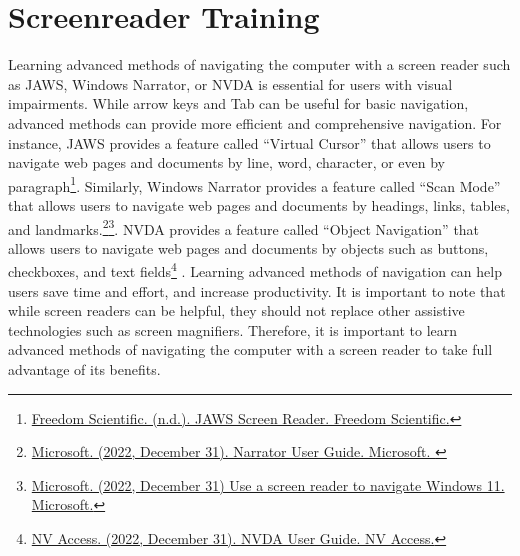 \pagebreak\hypertarget{appx7}{}\section[Screenreader Training]{Screenreader Training}\label{appx7}
Learning advanced methods of navigating the computer with a screen reader such as JAWS, Windows Narrator, or NVDA is essential for users with visual impairments. While arrow keys and Tab can be useful for basic navigation, advanced methods can provide more efficient and comprehensive navigation. For instance, JAWS provides a feature called “Virtual Cursor” that allows users to navigate web pages and documents by line, word, character, or even by paragraph\footnote{\raggedright \href{https://www.freedomscientific.com/products/software/jaws}{Freedom Scientific. (n.d.). JAWS Screen Reader. Freedom Scientific.}}. Similarly, Windows Narrator provides a feature called “Scan Mode” that allows users to navigate web pages and documents by headings, links, tables, and landmarks.\footnote{\raggedright \href{https://support.microsoft.com/en-us/windows/narrator-user-guide-4b2e6b3f-1d6d-8a5c-4f6d2a3b3d6f}{Microsoft. (2022, December 31). Narrator User Guide. Microsoft. }}\fnsep\footnote{\raggedright \href{https://support.microsoft.com/en-us/windows/use-a-screen-reader-to-navigate-windows-11-5f8a9e7c-7d3e-2d5a-0f5c-5f9b5b8a7a3d}{Microsoft. (2022, December 31) Use a screen reader to navigate Windows 11. Microsoft.}}. NVDA provides a feature called “Object Navigation” that allows users to navigate web pages and documents by objects such as buttons, checkboxes, and text fields\footnote{\raggedright \href{https://www.nvaccess.org/files/nvda/documentation/userGuide.html\#toc3.1}{NV Access. (2022, December 31). NVDA User Guide. NV Access.}}  . Learning advanced methods of navigation can help users save time and effort, and increase productivity. It is important to note that while screen readers can be helpful, they should not replace other assistive technologies such as screen magnifiers. Therefore, it is important to learn advanced methods of navigating the computer with a screen reader to take full advantage of its benefits.
